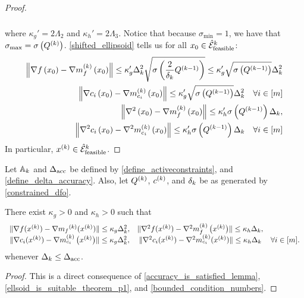 \begin{proof}
\begin{align*}
\begin{array}{cc}
\end{array}
\end{align*}
where $\kappa_{g}' = 2 \Lambda_2$ and $\kappa_{h}' = 2\Lambda_3$.
Notice that because $\sigma_{\textrm{min}} = 1$, we have that ${\sigma_{\textrm{max}}} = {\sigma} \left({Q^{(k)}}\right)$.
\cref{shifted_ellipsoid} tells us for all $x_0 \in {{\mathcal {\hat E}_{\text{feasible}}}^k}$:
\begin{align*}
\left\|\nabla f\left(x_0 \right) - \nabla m^{(k)}_f\left(x_0\right)\right\| \le 
\kappa'_g  \Delta_k^2 \sqrt{{\sigma} \left(\frac 2 {{\delta_k}} {Q^{(k-1)}}\right)} \le \kappa'_g \sqrt{{\sigma} \left({Q^{(k-1)}}\right)}\Delta_k^2 \\
\left\|\nabla {c_i}\left(x_0 \right) - \nabla m^{(k)}_{c_i}\left(x_0\right)\right\| \le \kappa'_g\sqrt{{\sigma} \left({Q^{(k-1)}}\right)} \Delta_k^2 \quad \forall i \in [m] \\
\left\|\nabla^2\left(x_0 \right) - \nabla m^{(k)}_f\left(x_0\right)\right\| \le \kappa'_h {\sigma} \left({Q^{(k-1)}}\right)\Delta_k, \\
\left\|\nabla^2 {c_i}\left(x_0 \right) - \nabla^2 m^{(k)}_{c_i}\left(x_0\right)\right\| \le \kappa'_h {\sigma} \left({Q^{(k-1)}}\right)\Delta_k \quad \forall i \in [m]
\end{align*}
In particular, $x^{(k)} \in {{\mathcal {\hat E}_{\text{feasible}}}^k}$.
\end{proof}


\begin{theorem}
\label{accuracy_is_satisfied}
Let ${\mathbb A_{k}}$ and ${\Delta_{\textrm{acc}}}$ be defined by \cref{define_activeconstraints}, and \cref{define_delta_accuracy}.
Also, let ${Q^{(k)}}$, ${c^{(k)}}$, and ${\delta_k}$ 
be as generated by \cref{constrained_dfo}.



There exist $\kappa_g>0$ and $\kappa_h>0$ such that
\begin{align*}
\begin{array}{ccc}
\|\nabla f(x^{(k)}) - \nabla {{m}_f}^{(k)}(x^{(k)}) \| \le \kappa_g \Delta_k^2, & \|\nabla^2 f(x^{(k)}) - {\nabla^2m_f^{(k)}\left(x^{(k)}\right)} \| \le \kappa_h \Delta_k, & \\
\|\nabla c_i(x^{(k)}) - {\nabla m_{c_i}^{(k)}\left(x^{(k)}\right)} \| \le \kappa_g \Delta_k^2, & \|\nabla^2 c_i(x^{(k)}) - \nabla^2 m_{c_i}^{(k)}(x^{(k)}) \| \le \kappa_h \Delta_k & \forall i \in [m]. \\
\end{array}
\end{align*}
whenever $\Delta_k \le {\Delta_{\textrm{acc}}}$.
\end{theorem}
\begin{proof}
This is a direct consequence of \cref{accuracy_is_satisfied_lemma}, \cref{ellsoid_is_suitable_theorem_p1}, and \cref{bounded_condition_numbers}.
\end{proof}

